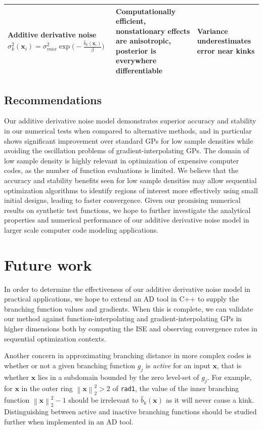 \documentclass{article}
\newcommand{\norm}[1]{\left\lVert#1\right\rVert}
\renewcommand{\vec}[1]{\mathbf{#1}}
\numberwithin{equation}{section}
\begin{document}
\begin{center}
\begin{tabularx}{\textwidth}{|p{}|p{}|X|}
    \hline
    \makecell[t]{
      \textbf{Additive derivative noise} \\
      $\sigma^2_k(\vec{x}_i) = \sigma^2_{max} \exp\big(- \frac{\hat{b}_k(\vec{x}_i)}{\beta}\big)$
    } & Computationally efficient, nonstationary effects are anisotropic, posterior is everywhere differentiable & Variance underestimates error near kinks \\
    \hline
  \end{tabularx}
\end{center}

\subsection{Recommendations}
Our additive derivative noise model demonstrates superior accuracy and stability in our numerical tests when compared to alternative methods, and in particular shows significant improvement over standard GPs for low sample densities while avoiding the oscillation problems of gradient-interpolating GPs. The domain of low sample density is highly relevant in optimization of expensive computer codes, as the number of function evaluations is limited. We believe that the accuracy and stability benefits seen for low sample densities may allow sequential optimization algorithms to identify regions of interest more effectively using small initial designs, leading to faster convergence. Given our promising numerical results on synthetic test functions, we hope to further investigate the analytical properties and numerical performance of our additive derivative noise model in larger scale computer code modeling applications.

\section{Future work} \label{future-work}
In order to determine the effectiveness of our additive derivative noise model in practical applications, we hope to extend an AD tool in C++ to supply the branching function values and gradients. When this is complete, we can validate our method against function-interpolating and gradient-interpolating GPs in higher dimensions both by computing the ISE and observing convergence rates in sequential optimization contexts.

Another concern in approximating branching distance in more complex codes is whether or not a given branching function $g_j$ is \textit{active} for an input $\vec{x}$, that is whether $\vec{x}$ lies in a subdomain bounded by the zero level-set of $g_j$. For example, for $\vec{x}$ in the outer ring $\norm{\vec{x}}_2^2 > 2$ of \texttt{rad1}, the value of the inner branching function $\norm{\vec{x}}_2^2 - 1$ should be irrelevant to $\hat{b}_k(\vec{x})$ as it will never cause a kink. Distinguishing between active and inactive branching functions should be studied further when implemented in an AD tool.
\end{document}
